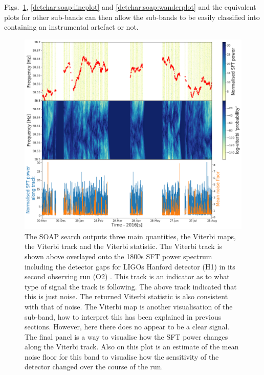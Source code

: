 Figs.~\ref{detchar:soap:noiseplot}, \ref{detchar:soap:lineplot} and \ref{detchar:soap:wanderplot} and the equivalent plots for other sub-bands can then allow the sub-bands to be easily classified into containing an instrumental artefact or not. 
\begin{figure}
	\centering
	\includegraphics[width=\textwidth]{C5_detchar/track_F58_5_58_7_noise.png}
	\caption{The SOAP search outputs three main quantities, the Viterbi maps, the Viterbi track and the Viterbi statistic. The Viterbi track is shown above overlayed onto the 1800s \ac{SFT} power spectrum including the detector gaps for \acp{LIGO} Hanford detector (H1) in its second observing run (O2) \citep{}. This track is an indicator as to what type of signal the track is following. The above track indicated that this is just noise. The returned Viterbi statistic is also consistent with that of noise. The Viterbi map is another visualisation of the sub-band, how to interpret this has been explained in previous sections. However, here there does no appear to be a clear signal. The final panel is a way to visualise how the \ac{SFT} power changes along the Viterbi track. Also on this plot is an estimate of the mean noise floor for this band to visualise how the sensitivity of the detector changed over the course of the run. }
	\label{detchar:soap:noiseplot}
\end{figure}

